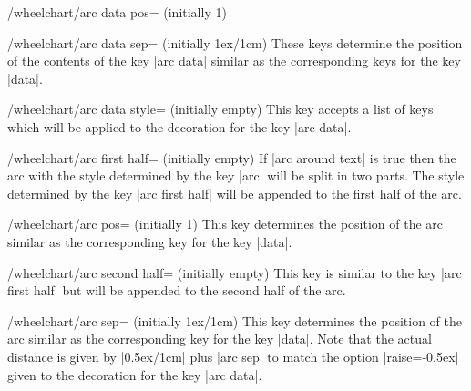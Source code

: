 \documentclass[a4paper,english,dvipsnames]{ltxdoc}
\begin{document}
\begin{key}{/wheelchart/arc data pos= (initially 1)}
\end{key}
\begin{key}{/wheelchart/arc data sep= (initially 1ex/1cm)}
These keys determine the position of the contents of the key |arc data| similar as the corresponding keys for the key |data|.
\end{key}
\begin{stylekey}{/wheelchart/arc data style= (initially \normalfont empty)}
This key accepts a list of keys which will be applied to the decoration for the key |arc data|.
\end{stylekey}
\begin{stylekey}{/wheelchart/arc first half= (initially \normalfont empty)}
If |arc around text| is true then the arc with the style determined by the key |arc| will be split in two parts. The style determined by the key |arc first half| will be appended to the first half of the arc.
\end{stylekey}
\begin{key}{/wheelchart/arc pos= (initially 1)}
This key determines the position of the arc similar as the corresponding key for the key |data|.
\end{key}
\begin{stylekey}{/wheelchart/arc second half= (initially \normalfont empty)}
This key is similar to the key |arc first half| but will be appended to the second half of the arc.
\end{stylekey}
\begin{key}{/wheelchart/arc sep= (initially 1ex/1cm)}
This key determines the position of the arc similar as the corresponding key for the key |data|. Note that the actual distance is given by |0.5ex/1cm| plus |arc sep| to match the option |raise=-0.5ex| given to the decoration for the key |arc data|.
\begin{codeexample}[width=10cm,preamble={\usetikzlibrary{decorations.text}}]
\end{codeexample}
\end{key}
\end{document}
